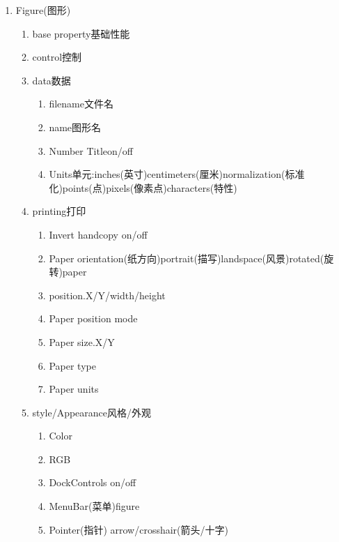         \begin{enumerate}
          \item Figure(图形)
            \begin{enumerate}
               \item base property\quad 基础性能
                \item control\quad 控制
                \item data\quad 数据
                  \begin{enumerate}
                   \item filename\qquad 文件名
                   \item name\qquad 图形名
                   \item Number Title\qquad on/off
                   \item Units单元:inches(英寸)centimeters(厘米)normalization(标准化)points(点)pixels(像素点)characters(特性)
                   \end{enumerate}
               \item printing\quad 打印
               \begin{enumerate}
                   \item  Invert handcopy  on/off
                   \item Paper orientation(纸方向)portrait(描写)landspace(风景)rotated(旋转)paper
                   \item position.X/Y/width/height
                   \item Paper position mode
                   \item Paper size.X/Y
                   \item Paper type
                   \item Paper units
                   \end{enumerate}
                \item style/Appearance\quad 风格/外观
                  \begin{enumerate}
                   \item  Color
                   \item RGB
                   \item DockControls  on/off
                   \item MenuBar(菜单)\qquad figure
                   \item Pointer(指针) \qquad arrow/crosshair(箭头/十字)
                   \end{enumerate}
            \end{enumerate}
        \end{enumerate}

